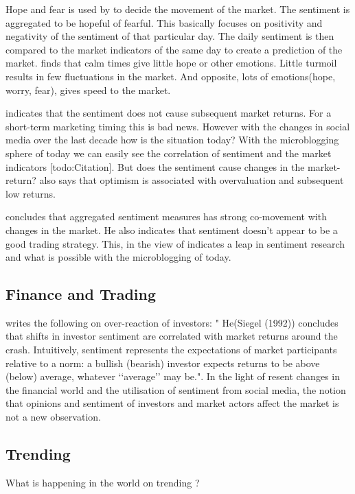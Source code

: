 Hope and fear is used by \cite[]{Zhang201155} to decide the movement of the
market. The sentiment is aggregated to be hopeful of fearful. This basically
focuses on positivity and negativity of the sentiment of that particular day.
The daily sentiment is then compared to the market indicators of the same day
to create a prediction of the market. \cite[]{Zhang201155} finds that calm
times give little hope or other emotions. Little turmoil results in few fluctuations in the market. 
And opposite, lots of emotions(hope, worry, fear), gives speed to the market.

\cite[p3]{Brown20041} indicates that the sentiment does not cause subsequent
market returns. For a short-term marketing timing this is bad news. However
with the changes in social media over the last decade how is the situation
today? With the microblogging sphere of today we can easily see the
correlation of sentiment and the market indicators [todo:Citation]. But
does the sentiment cause changes in the market-return?
\cite[p3]{Brown20041} also says that optimism is associated with overvaluation and subsequent low returns.

\cite[p]{Brown20041} concludes that aggregated sentiment measures has strong
co-movement with changes in the market. He also indicates that sentiment
doesn't appear to be a good trading strategy. This, in the view of
\cite[]{Zhang201155} indicates a leap in sentiment research and what is possible
with the microblogging of today.

\subsection{Finance and Trading}


\cite[p2]{Brown20041} writes the following on over-reaction of investors: "
He(Siegel (1992)) concludes that shifts in investor sentiment are correlated with market
returns around the crash. Intuitively, sentiment represents the expectations of market participants
relative to a norm: a bullish (bearish) investor expects returns to be above
(below) average, whatever ‘‘average’’ may be.". In the light of resent changes
in the financial world and the utilisation of sentiment from social media, the
notion that opinions and sentiment of investors and market actors affect the
market is not a new observation.

\subsection{Trending}
What is happening in the world on trending ? 


